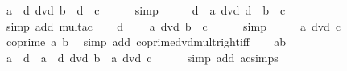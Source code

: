 \begin{isabellebody}
\ {\isachardoublequoteopen}a{\isacharprime}{\kern0pt}\ {\isacharasterisk}{\kern0pt}\ {\isacharquery}{\kern0pt}d\ dvd\ {\isacharparenleft}{\kern0pt}b{\isacharprime}{\kern0pt}\ {\isacharasterisk}{\kern0pt}\ {\isacharquery}{\kern0pt}d{\isacharparenright}{\kern0pt}\ {\isacharasterisk}{\kern0pt}\ c{\isachardoublequoteclose}\isanewline
\ \ \ \ \isamarkupfalse%
\ simp\isanewline
\ \ \isamarkupfalse%
\ \isamarkupfalse%
\ {\isachardoublequoteopen}{\isacharquery}{\kern0pt}d\ {\isacharasterisk}{\kern0pt}\ a{\isacharprime}{\kern0pt}\ dvd\ {\isacharquery}{\kern0pt}d\ {\isacharasterisk}{\kern0pt}\ {\isacharparenleft}{\kern0pt}b{\isacharprime}{\kern0pt}\ {\isacharasterisk}{\kern0pt}\ c{\isacharparenright}{\kern0pt}{\isachardoublequoteclose}\isanewline
\ \ \ \ \isamarkupfalse%
\ {\isacharparenleft}{\kern0pt}simp\ add{\isacharcolon}{\kern0pt}\ mult{\isacharunderscore}{\kern0pt}ac{\isacharparenright}{\kern0pt}\isanewline
\ \ \isamarkupfalse%
\ {\isacartoucheopen}{\isacharquery}{\kern0pt}d\ {\isasymnoteq}\ {}{\isacartoucheclose}\ \isamarkupfalse%
\ {\isachardoublequoteopen}a{\isacharprime}{\kern0pt}\ dvd\ b{\isacharprime}{\kern0pt}\ {\isacharasterisk}{\kern0pt}\ c{\isachardoublequoteclose}\isanewline
\ \ \ \ \isamarkupfalse%
\ simp\isanewline
\ \ \isamarkupfalse%
\ \isamarkupfalse%
\ {\isachardoublequoteopen}a{\isacharprime}{\kern0pt}\ dvd\ c{\isachardoublequoteclose}\isanewline
\ \ \ \ \isamarkupfalse%
\ {\isacartoucheopen}coprime\ a{\isacharprime}{\kern0pt}\ b{\isacharprime}{\kern0pt}{\isacartoucheclose}\ \isamarkupfalse%
\ {\isacharparenleft}{\kern0pt}simp\ add{\isacharcolon}{\kern0pt}\ coprime{\isacharunderscore}{\kern0pt}dvd{\isacharunderscore}{\kern0pt}mult{\isacharunderscore}{\kern0pt}right{\isacharunderscore}{\kern0pt}iff{\isacharparenright}{\kern0pt}\isanewline
\ \ \isamarkupfalse%
\ ab{\isacharprime}{\kern0pt}{\isacharparenleft}{\kern0pt}{}{\isacharparenright}{\kern0pt}\ \isamarkupfalse%
\ {\isachardoublequoteopen}a\ {\isacharequal}{\kern0pt}\ {\isacharquery}{\kern0pt}d\ {\isacharasterisk}{\kern0pt}\ a{\isacharprime}{\kern0pt}\ {\isasymand}\ {\isacharquery}{\kern0pt}d\ dvd\ b\ {\isasymand}\ a{\isacharprime}{\kern0pt}\ dvd\ c{\isachardoublequoteclose}\isanewline
\ \ \ \ \isamarkupfalse%
\ {\isacharparenleft}{\kern0pt}simp\ add{\isacharcolon}{\kern0pt}\ ac{\isacharunderscore}{\kern0pt}simps{\isacharparenright}{\kern0pt}\isanewline

\end{isabellebody}
